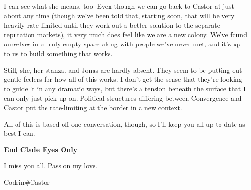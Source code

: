 I can see what she means, too. Even though we can go back to Castor at just about any time (though we've been told that, starting soon, that will be very heavily rate limited until they work out a better solution to the separate reputation markets), it very much does feel like we are a new colony. We've found ourselves in a truly empty space along with people we've never met, and it's up to us to build something that works.

Still, she, her stanza, and Jonas are hardly absent. They seem to be putting out gentle feelers for how all of this works. I don't get the sense that they're looking to guide it in any dramatic ways, but there's a tension beneath the surface that I can only just pick up on. Political structures differing between Convergence and Castor put the rate-limiting at the border in a new context.

All of this is based off one conversation, though, so I'll keep you all up to date as best I can.

\textbf{End Clade Eyes Only}

I miss you all. Pass on my love.

Codrin\#Castor
